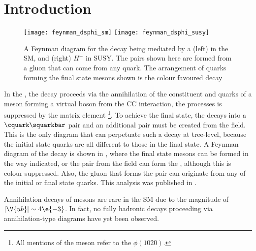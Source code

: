 \section{Introduction}

\begin{figure}[bh]
  \begin{center}
    \texttt{[image: feynman\_dsphi\_sm]}
    \texttt{[image: feynman\_dsphi\_susy]}
    \caption[Feynman diagram for the decay \btodsphi]
    {
      A Feynman diagram for the decay \btodsphi being mediated by a
      (left) \Wp in the SM, and
      (right) $H^+$ in SUSY.
      The \ssbar pairs shown here are formed from a gluon that can come from any quark.
      The arrangement of quarks forming the final state mesons shown is the colour favoured decay
    }
    \label{fig:dsphi:feyn}
  \end{center}
\end{figure}

In the \sm, the decay \btodsphi proceeds via the annihilation of the constituent \bquark and \uquark
quarks of a \Bp meson
forming a virtual \Wp boson from the \gls{CC} interaction, the processes is suppressed by the \ckm
matrix element \footnote{
  All mentions of the \phii meson refer to the $\phi(1020)$.
}.
To achieve the final state, the \Wp decays into a $\cquark\squarkbar$ pair and an additional
\ssbar pair must be created from the \QCD field.
This is the only diagram that can perpetuate such a decay at tree-level, because the initial state
quarks are all different to those in the final state.
A Feynman diagram of the decay \btodsphi is shown in , where
the final state mesons can be formed in the way indicated, or the \ssbar pair from the \QCD field
can form the \phii, although this is colour-suppressed.
Also, the gluon that forms the \ssbar pair can originate from any of the initial or final state
quarks.
This analysis was published in .

Annihilation decays of \Bp mesons are rare in the SM due to the magnitude of
$|\V{ub}|\sim4\e{-3}$.
In fact, no fully hadronic decays proceeding via annihilation-type diagrams have yet been
observed.





